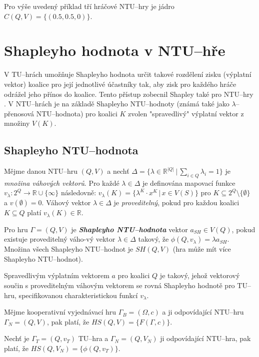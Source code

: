         Pro výše uvedený příklad tří hráčové NTU--hry je jádro $C(Q, V) = \{(0.5, 0.5, 0)\}$.

\section{Shapleyho hodnota v NTU--hře}
    \label{sec:Shapley}
    V TU--hrách umožňuje Shapleyho hodnota \cite{Shapley1953} určit takové rozdělení zisku (výplatní vektor) koalice pro její jednotlivé účastníky tak, aby zisk pro každého hráče odrážel jeho přínos do koalice. Tento přístup zobecnil Shapley také pro NTU--hry \cite{Shapley1969}. V NTU--hrách je na základě Shapleyho NTU--hodnoty (známá také jako $\lambda$--přenosová NTU--hodnota) pro koalici $K$ zvolen "spravedlivý" výplatní vektor z množiny $V(K)$.

    \subsection{Shapleyho NTU--hodnota}
        Mějme danou NTU--hru $(Q, V)$ a nechť $\Delta = \{\lambda \in \mathbb{R}^{|Q|}\,|\, \sum_{i\in Q}\lambda_i = 1\}$ je \textit{množina váhových vektorů}. Pro každé $\lambda \in \Delta$ je definována mapovací funkce $v_\lambda: 2^Q \rightarrow \mathbb{R} \cup \{\infty\}$ následovně: $v_\lambda(K) = \{\lambda^K \cdot x^K\,|\, x \in V(S)\}$ pro $K \subseteq 2^Q \setminus \{\emptyset\}$ a $v(\emptyset) = 0$. Váhový vektor $\lambda \in \Delta$ je \textit{proveditelný}, pokud pro každou koalici $K \subseteq Q$ platí $v_\lambda(K) \in \mathbb{R}$.

        Pro hru $\Gamma = (Q, V)$ je \textit{\textbf{Shapleyho NTU--hodnota}} vektor $a_{SH} \in V(Q)$, pokud existuje proveditelný váho-vý vektor $\lambda \in \Delta$ takový, že $\phi(Q, v_\lambda) = \lambda a_{SH}$. Množina všech Shapleyho NTU--hodnot je $SH(Q, V)$ (hra může mít více Shapleyho NTU--hodnot).

        Spravedlivým výplatním vektorem $a$ pro koalici $Q$ je takový, jehož vektorový součin s proveditelným váhovým vektorem se rovná Shapleyho hodnotě pro TU--hru, specifikovanou charakteristickou funkcí $v_\lambda$.

        Mějme kooperativní vyjednávací hru $\Gamma_B = (\Omega, c)$ a ji odpovídající NTU--hru $\Gamma_N = (Q, V)$, pak platí, že $HS(Q, V) = \{F(\Gamma, c)\}$.

        Nechť je $\Gamma_T = (Q, v_T)$ TU--hra a $\Gamma_N = (Q, V_N)$ ji odpovídající NTU--hra, pak platí, že $HS(Q, V_N) = \{\phi(Q, v_T)\}$.

